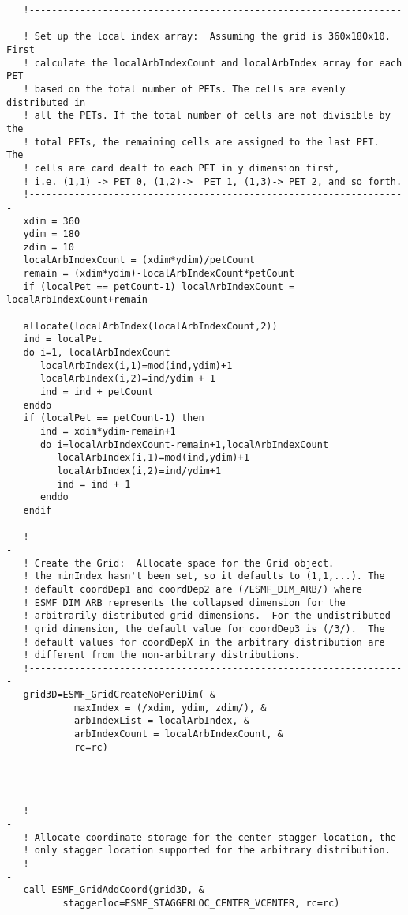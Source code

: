 \begin{verbatim}
   !-------------------------------------------------------------------
   ! Set up the local index array:  Assuming the grid is 360x180x10.  First
   ! calculate the localArbIndexCount and localArbIndex array for each PET
   ! based on the total number of PETs. The cells are evenly distributed in
   ! all the PETs. If the total number of cells are not divisible by the
   ! total PETs, the remaining cells are assigned to the last PET.  The
   ! cells are card dealt to each PET in y dimension first,
   ! i.e. (1,1) -> PET 0, (1,2)->  PET 1, (1,3)-> PET 2, and so forth.
   !-------------------------------------------------------------------
   xdim = 360
   ydim = 180
   zdim = 10
   localArbIndexCount = (xdim*ydim)/petCount
   remain = (xdim*ydim)-localArbIndexCount*petCount
   if (localPet == petCount-1) localArbIndexCount = localArbIndexCount+remain

   allocate(localArbIndex(localArbIndexCount,2))
   ind = localPet
   do i=1, localArbIndexCount
      localArbIndex(i,1)=mod(ind,ydim)+1
      localArbIndex(i,2)=ind/ydim + 1
      ind = ind + petCount
   enddo
   if (localPet == petCount-1) then
      ind = xdim*ydim-remain+1
      do i=localArbIndexCount-remain+1,localArbIndexCount
         localArbIndex(i,1)=mod(ind,ydim)+1
         localArbIndex(i,2)=ind/ydim+1
         ind = ind + 1
      enddo
   endif

   !-------------------------------------------------------------------
   ! Create the Grid:  Allocate space for the Grid object.
   ! the minIndex hasn't been set, so it defaults to (1,1,...). The
   ! default coordDep1 and coordDep2 are (/ESMF_DIM_ARB/) where
   ! ESMF_DIM_ARB represents the collapsed dimension for the
   ! arbitrarily distributed grid dimensions.  For the undistributed
   ! grid dimension, the default value for coordDep3 is (/3/).  The
   ! default values for coordDepX in the arbitrary distribution are
   ! different from the non-arbitrary distributions.
   !-------------------------------------------------------------------
   grid3D=ESMF_GridCreateNoPeriDim( &
            maxIndex = (/xdim, ydim, zdim/), &
            arbIndexList = localArbIndex, &
            arbIndexCount = localArbIndexCount, &
            rc=rc)
 
\end{verbatim}
 

 \begin{verbatim}


   !-------------------------------------------------------------------
   ! Allocate coordinate storage for the center stagger location, the
   ! only stagger location supported for the arbitrary distribution.
   !-------------------------------------------------------------------
   call ESMF_GridAddCoord(grid3D, &
          staggerloc=ESMF_STAGGERLOC_CENTER_VCENTER, rc=rc)
 
\end{verbatim}
 
